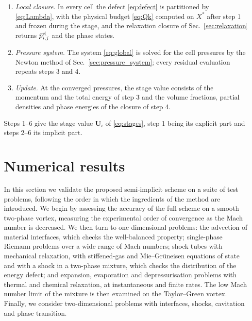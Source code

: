 \documentclass[a4paper,fleqn]{cas-sc}
\begin{document}
\begin{enumerate}
\item \emph{Local closure.} In every cell the defect \eqref{eq:defect} is partitioned by \eqref{eq:Lambda}, with the
physical budget \eqref{eq:Qk} computed on $X^*$ after step 1 and frozen during the stage, and the relaxation closure of
Sec.~\ref{sec:relaxation} returns $\bar p^{\rm cl}_{i,j}$ and the phase states.
\item \emph{Pressure system.} The system \eqref{eq:global} is solved for the cell pressures by the Newton method of
Sec.~\ref{sec:pressure_system}; every residual evaluation repeats steps 3 and 4.
\item \emph{Update.} At the converged pressures, the stage value consists of the momentum and the total energy of
step 3 and the volume fractions, partial densities and phase energies of the closure of step 4.
\end{enumerate}
Steps 1--6 give the stage value $\mathbf U_i$ of \eqref{eq:stages}, step 1 being its explicit part and steps 2--6 its implicit part.






\section{Numerical results}
\label{sec:results}

In this section we validate the proposed semi-implicit scheme on a suite of test problems, following the order in
which the ingredients of the method are introduced. We begin by assessing the accuracy of the full scheme on a smooth
two-phase vortex, measuring the experimental order of convergence as the Mach number is decreased. We then turn to
one-dimensional problems: the advection of material interfaces, which checks the well-balanced property; single-phase
Riemann problems over a wide range of Mach numbers; shock tubes with mechanical relaxation, with stiffened-gas and
Mie--Gr\"uneisen equations of state and with a shock in a two-phase mixture, which checks the distribution of the
energy defect; and expansion, evaporation and depressurisation problems with thermal and chemical relaxation, at
instantaneous and finite rates. The low Mach number limit of the mixture is then examined on the Taylor--Green
vortex. Finally, we consider two-dimensional problems with interfaces, shocks, cavitation and phase transition.
\end{document}
